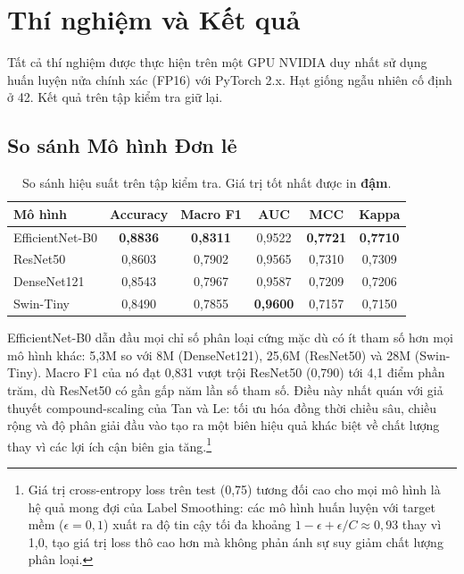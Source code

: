 \chapter{Thí nghiệm và Kết quả}

Tất cả thí nghiệm được thực hiện trên một GPU NVIDIA duy nhất sử dụng huấn luyện nửa chính xác (FP16) với PyTorch 2.x. Hạt giống ngẫu nhiên cố định ở 42. Kết quả trên tập kiểm tra giữ lại.

\section{So sánh Mô hình Đơn lẻ}

\begin{table}[H]
\centering
\caption{So sánh hiệu suất trên tập kiểm tra. Giá trị tốt nhất được in \textbf{đậm}.}
\begin{tabular}{lccccc}
\toprule
\textbf{Mô hình} & \textbf{Accuracy} & \textbf{Macro F1} & \textbf{AUC} & \textbf{MCC} & \textbf{Kappa} \\
\midrule
EfficientNet-B0 & \textbf{0,8836} & \textbf{0,8311} & 0,9522 & \textbf{0,7721} & \textbf{0,7710} \\
ResNet50        & 0,8603 & 0,7902 & 0,9565 & 0,7310 & 0,7309 \\
DenseNet121     & 0,8543 & 0,7967 & 0,9587 & 0,7209 & 0,7206 \\
Swin-Tiny       & 0,8490 & 0,7855 & \textbf{0,9600} & 0,7157 & 0,7150 \\
\bottomrule
\end{tabular}
\end{table}

EfficientNet-B0 dẫn đầu mọi chỉ số phân loại cứng mặc dù có ít tham số hơn mọi mô hình khác: 5,3M so với 8M (DenseNet121), 25,6M (ResNet50) và 28M (Swin-Tiny). Macro F1 của nó đạt 0,831 vượt trội ResNet50 (0,790) tới 4,1 điểm phần trăm, dù ResNet50 có gần gấp năm lần số tham số. Điều này nhất quán với giả thuyết compound-scaling của Tan và Le: tối ưu hóa đồng thời chiều sâu, chiều rộng và độ phân giải đầu vào tạo ra một biên hiệu quả khác biệt về chất lượng thay vì các lợi ích cận biên gia tăng.\footnote{Giá trị cross-entropy loss trên test (0,75) tương đối cao cho mọi mô hình là hệ quả mong đợi của Label Smoothing: các mô hình huấn luyện với target mềm ($\epsilon=0{,}1$) xuất ra độ tin cậy tối đa khoảng $1 - \epsilon + \epsilon/C \approx 0{,}93$ thay vì 1,0, tạo giá trị loss thô cao hơn mà không phản ánh sự suy giảm chất lượng phân loại.}

